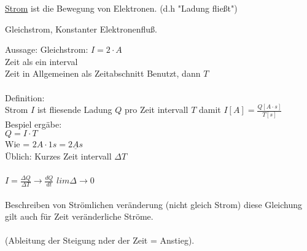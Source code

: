 \underline{Strom} ist die Bewegung von Elektronen. (d.h "Ladung fließt")

Gleichstrom, Konstanter Elektronenfluß.


\begin{figure}[h]
  \begin{center}
  \end{center}
\end{figure}

Aussage: Gleichstrom: $I = 2 \cdot A$\\
Zeit als ein interval\\
Zeit in Allgemeinen als Zeitabschnitt Benutzt, dann $T$\\
\\
Definition:\\
Strom $I$ ist fliesende Ladung $Q$ pro Zeit intervall $T$ damit $ I[A] = \frac{Q[A\cdot s]}{T[s]} $\\
Bespiel ergäbe:\\
$ Q = I \cdot T$\\
Wie = $2 A \cdot 1s  = \underline{2 As} $\\
Üblich: Kurzes Zeit intervall $\Delta T$\\
\\
$ I = \frac{\Delta Q}{\Delta T} \rightarrow \frac{d Q}{d t} $  
$ lim \Delta \rightarrow 0 $ \\
\\
Beschreiben von Strömlichen veränderung (nicht gleich Strom) diese Gleichung gilt auch für Zeit veränderliche Ströme.\\
\\
(Ableitung der Steigung nder der Zeit = Anstieg).\\


